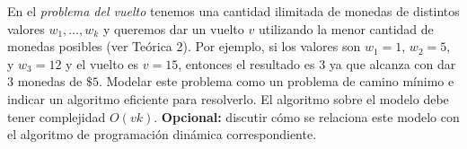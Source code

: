 
 \item En el \emph{problema del vuelto} tenemos una cantidad ilimitada de monedas de distintos valores $w_1, \ldots, w_k$ y queremos dar un vuelto $v$ utilizando la menor cantidad de monedas posibles (ver Teórica 2).  Por ejemplo, si los valores son $w_1 = 1$, $w_2 = 5$, y $w_3 = 12$ y el vuelto es $v = 15$, entonces el resultado es $3$ ya que alcanza con dar $3$ monedas de $\$5$.  Modelar este problema como un problema de camino mínimo e indicar un algoritmo eficiente para resolverlo.  El algoritmo sobre el modelo debe tener complejidad $O(vk)$.  \textbf{Opcional:} discutir cómo se relaciona este modelo con el algoritmo de programación dinámica correspondiente.


